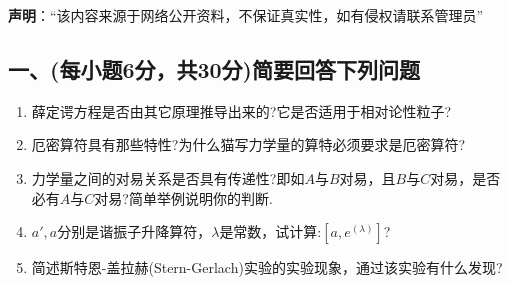 
\textbf{声明}：“该内容来源于网络公开资料，不保证真实性，如有侵权请联系管理员”

\subsection{一、(每小题6分，共30分)简要回答下列问题}
\begin{enumerate}
\item 薛定谔方程是否由其它原理推导出来的?它是否适用于相对论性粒子?
\item 厄密算符具有那些特性?为什么猫写力学量的算特必须要求是厄密算符?
\item 力学量之间的对易关系是否具有传递性?即如$A$与$B$对易，且$B$与$C$对易，是否必有$A$与$C$对易?简单举例说明你的判断.
\item $a',a$分别是谐振子升降算符，$\lambda$是常数，试计算:$\left[ a,e^(\lambda) \right]$?
\item 简述斯特恩-盖拉赫(Stern-Gerlach)实验的实验现象，通过该实验有什么发现?
\end{enumerate}
